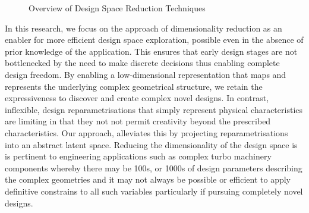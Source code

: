 \documentclass{article}
\begin{document}
\begin{figure}[h!]
\centering
{}
\caption{Overview of Design Space Reduction Techniques}
\end{figure}

In this research, we focus on the approach of dimensionality reduction as an enabler for more efficient design space exploration, possible even in the absence of prior knowledge of the application. This ensures that early design stages are not bottlenecked by the need to make discrete decisions thus enabling complete design freedom. By enabling a low-dimensional representation that maps and represents the underlying complex geometrical structure, we retain the expressiveness to discover and create complex novel designs. In contrast, inflexible, design reparametrisations that simply represent physical characteristics are limiting in that they not not permit creativity beyond the prescribed characteristics. Our approach, alleviates this by projecting reparametrisations into an 
abstract latent space.   Reducing the dimensionality of the design space is is pertinent to engineering applications such as complex turbo machinery components whereby there may be 100s, or 1000s of design parameters describing the complex geometries and it may not always be possible or efficient to apply definitive constrains to all such variables particularly if pursuing completely novel designs.
\end{document}
